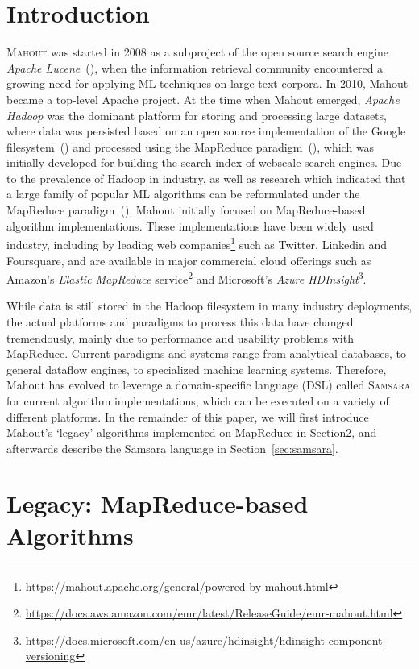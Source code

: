 \documentclass[twoside,11pt]{article}
\begin{document}
\section{Introduction}

\textsc{Mahout} was started in 2008 as a subproject of the open source search engine \textit{Apache Lucene}~(\cite{Owen2012,Mccandless2010}), when the information retrieval community encountered a growing need for applying ML techniques on large text corpora. In 2010, Mahout became a top-level Apache project. At the time when Mahout emerged, \textit{Apache Hadoop} was the dominant platform for storing and processing large datasets, where data was persisted based on an open source implementation of the Google filesystem~(\cite{Ghemawat2003}) and processed using the MapReduce paradigm~(\cite{Dean2008}), which was initially developed for building the search index of webscale search engines. Due to the prevalence of Hadoop in industry, as well as research which indicated that a large family of popular ML algorithms can be reformulated under the MapReduce paradigm~(\cite{Chu2007}), Mahout initially focused on MapReduce-based algorithm implementations. These implementations have been widely used industry, including by leading web companies\footnote{\url{https://mahout.apache.org/general/powered-by-mahout.html}} such as Twitter, Linkedin and Foursquare, and are available in major commercial cloud offerings such as Amazon's \textit{Elastic MapReduce} service\footnote{\url{https://docs.aws.amazon.com/emr/latest/ReleaseGuide/emr-mahout.html}} and Microsoft's \textit{Azure HDInsight}\footnote{\url{https://docs.microsoft.com/en-us/azure/hdinsight/hdinsight-component-versioning}}.

While data is still stored in the Hadoop filesystem in many industry deployments, the actual platforms and paradigms to process this data have changed tremendously, mainly due to performance and usability problems with MapReduce. Current paradigms and systems range from analytical databases, to general dataflow engines, to specialized machine learning systems. Therefore, Mahout has evolved to leverage a domain-specific language (DSL) called \textsc{Samsara} for current algorithm implementations, which can be executed on a variety of different platforms. In the remainder of this paper, we will first introduce Mahout's `legacy' algorithms implemented on MapReduce in Section\ref{sec:legacy}, and afterwards describe the Samsara language in Section~\ref{sec:samsara}.

\section{Legacy: MapReduce-based Algorithms}
\label{sec:legacy}
\end{document}
